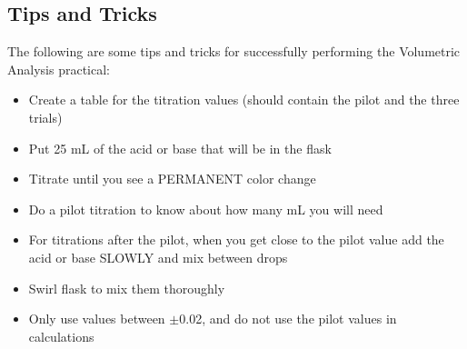 \subsection{Tips and Tricks}
\noindent The following are some tips and tricks for successfully performing the Volumetric Analysis practical:
\begin{itemize}[topsep=0ex,itemsep=0ex,partopsep=1ex,parsep=1ex]
	\item Create a table for the titration values (should contain the pilot and the three trials)
	\item Put 25 mL of the acid or base that will be in the flask
	\item Titrate until you see a PERMANENT color change
	\item Do a pilot titration to know about how many mL you will need
	\item For titrations after the pilot, when you get close to the pilot value add the acid or base SLOWLY and mix between drops
	\item Swirl flask to mix them thoroughly
	\item Only use values between $\pm$0.02, and do not use the pilot values in calculations
\end{itemize}
